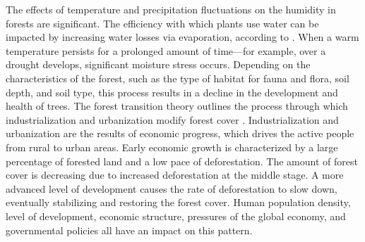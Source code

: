The effects of temperature and precipitation fluctuations on the humidity in forests are significant. The efficiency with which plants use water can be impacted by increasing water losses via evaporation, according to \parencite{mortsch2006impact}. When a warm temperature persists for a prolonged amount of time—for example, over a drought develops, significant moisture stress occurs. Depending on the characteristics of the forest, such as the type of habitat for fauna and flora, soil depth, and soil type, this process results in a decline in the development and health of trees.
The forest transition theory outlines the process through which industrialization and urbanization modify forest cover \parencite{rudel2010forest}. Industrialization and urbanization are the results of economic progress, which drives the active people from rural to urban areas. Early economic growth is characterized by a large percentage of forested land and a low pace of deforestation. The amount of forest cover is decreasing due to increased deforestation at the middle stage. A more advanced level of development causes the rate of deforestation to slow down, eventually stabilizing and restoring the forest cover. Human population density, level of development, economic structure, pressures of the global economy, and governmental policies all have an impact on this pattern.





